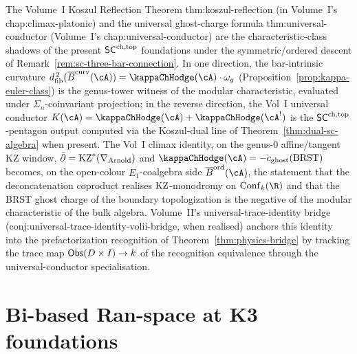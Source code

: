 \begin{remark}
\label{rem:foundations-koszul-reflection-anchor}%
%
%
The Volume~I Koszul Reflection Theorem
\textsf{thm:koszul-reflection}
(in Volume~I's
\textsf{chap:climax-platonic}) and the universal
ghost-charge formula \textsf{thm:universal-conductor}
(Volume~I's \textsf{chap:universal-conductor}) are the
characteristic-class shadows of the present
$\mathsf{SC}^{\mathrm{ch},\mathrm{top}}$ foundations under the symmetric/ordered descent of
Remark~\ref{rem:sc-three-bar-connection}. In one direction,
the bar-intrinsic curvature
$\dfib^{\,2}(\barB^{\mathrm{curv}}(\cA)) = \kappaChHodge(\cA) \cdot \omega_g$
(Proposition~\ref{prop:kappa-euler-class}) is the genus-tower
witness of the modular characteristic, evaluated under
$\Sigma_n$-coinvariant projection; in the reverse direction,
the Vol~I universal conductor
$K(\cA) = \kappaChHodge(\cA) + \kappaChHodge(\cA^!)$ is the $\mathsf{SC}^{\mathrm{ch},\mathrm{top}}$-pentagon
output computed via the Koszul-dual line of
Theorem~\ref{thm:dual-sc-algebra}
when present.
The Vol~I climax identity, on the genus-$0$ affine/tangent KZ window,
$\bar\partial = \mathrm{KZ}^*(\nabla_{\mathrm{Arnold}})$ and
$\kappaChHodge(\cA) = -c_{\mathrm{ghost}}(\mathrm{BRST})$
becomes, on the open-colour $E_1$-coalgebra side
$\barB^{\mathrm{ord}}(\cA)$, the statement that the
deconcatenation coproduct realises
$\mathrm{KZ}$-monodromy on $\Conf_k(\R)$ and that the BRST ghost
charge of the boundary topologization is the negative of the
modular characteristic of the bulk algebra. Volume~II's
universal-trace-identity bridge
(\textsf{conj:universal-trace-identity-volii-bridge}, when
realised) anchors this identity into the prefactorization recognition
of Theorem~\ref{thm:physics-bridge} by tracking the trace map
$\mathsf{Obs}(D \times I) \to k$ of the recognition equivalence
through the universal-conductor specialisation.
\end{remark}


\section{Bi-based Ran-space at K3 foundations}
\label{sec:vol2-found-supplement}

